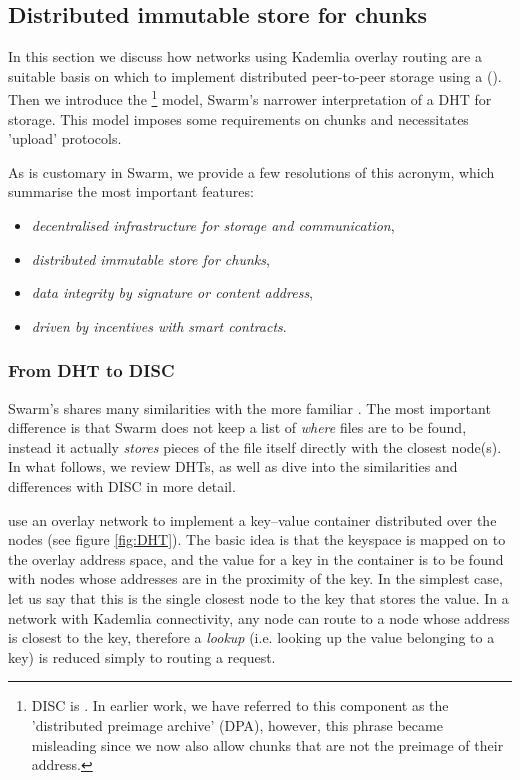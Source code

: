 \subsection{Distributed immutable store for chunks\statusgreen}\label{sec:disc}
 
In this section we discuss how networks using Kademlia overlay routing are a suitable basis on which to implement distributed peer-to-peer storage using a  (). Then we introduce the %
%
\footnote{DISC is . In earlier work, we have referred to this component as the 'distributed preimage archive' (DPA), however, this phrase became misleading since we now also allow chunks that are not the preimage of their address.}
% 
model, Swarm's narrower interpretation of a DHT for storage. This model 
imposes some requirements on chunks and necessitates 'upload' protocols. 

As is customary in Swarm, we provide a few resolutions of this acronym, which summarise the most important features:


\begin{itemize}
\item \emph{decentralised infrastructure for storage and communication}, 
\item \emph{distributed immutable store for chunks}, 
\item \emph{data integrity by signature or content address},
\item \emph{driven by incentives with smart contracts}. 

\end{itemize}
 
\subsubsection{From DHT to DISC}
Swarm's  shares many similarities with the more familiar . The most important difference is that Swarm does not keep a list of \emph{where} files are to be found, instead it actually \emph{stores} pieces of the file itself directly with the closest node(s). 
In what follows, we review DHTs, as well as dive into the similarities and differences with DISC in more detail. 
 
 use an overlay network to implement a key--value container distributed over the nodes (see figure \ref{fig:DHT}). The basic idea is that the keyspace is mapped on to the overlay address space, and the value for a key in the container is to be found with nodes whose addresses are in the proximity of the key. In the simplest case, let us say that this is the single closest node to the key that stores the value. In a network with Kademlia connectivity, any node can route to a node whose address is closest to the key, therefore a \emph{lookup} (i.e. looking up the value belonging to a key) is reduced simply to routing a request. 

